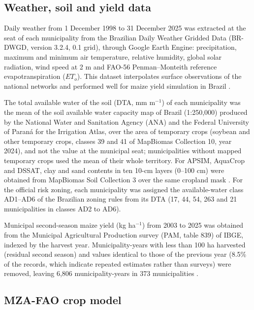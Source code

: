 \documentclass[10pt,a4paper]{article}
\begin{document}
\subsection{Weather, soil and yield data}
\label{subsec:data}

Daily weather from 1 December 1998 to 31 December 2025 was extracted at the seat of each municipality
from the Brazilian Daily Weather Gridded Data (BR-DWGD, version 3.2.4, 0.1\textdegree{} grid), through
Google Earth Engine: precipitation, maximum and minimum air temperature, relative humidity, global solar
radiation, wind speed at 2 m and FAO-56 Penman--Monteith reference evapotranspiration ($ET_o$). This
dataset interpolates surface observations of the national networks and performed well for maize yield
simulation in Brazil \citep{xavier2022, duarte2019, allen1998}.

The total available water of the soil (DTA, mm m$^{-1}$) of each municipality was the mean of the soil
available water capacity map of Brazil (1:250,000) produced by the National Water and Sanitation Agency
(ANA) and the Federal University of Paraná for the Irrigation Atlas, over the area of
temporary crops (soybean and other temporary crops,
classes 39 and 41 of MapBiomas Collection 10, year 2024), and not the value at the municipal seat;
municipalities without mapped temporary crops used the mean of their whole territory. For APSIM,
AquaCrop and DSSAT, clay and sand contents in ten 10-cm layers (0--100 cm) were obtained from MapBiomas
Soil Collection 3 over the same cropland mask \citep{ana_awc, souza2020}. For the official risk zoning, each municipality was assigned the
available-water class AD1--AD6 of the Brazilian zoning rules from its DTA (17, 44, 54, 263 and 21
municipalities in classes AD2 to AD6).

Municipal second-season maize yield (kg ha$^{-1}$) from 2003 to 2025 was obtained from the Municipal
Agricultural Production survey (PAM, table 839) of IBGE, indexed by the harvest year. Municipality-years
with less than 100 ha harvested (residual second season) and values identical to those of the previous
year (8.5\% of the records, which indicate repeated estimates rather than surveys) were removed, leaving
6,806 municipality-years in 373 municipalities \citep{ibge2025}.

\subsection{MZA-FAO crop model}
\label{subsec:mza}
\end{document}
